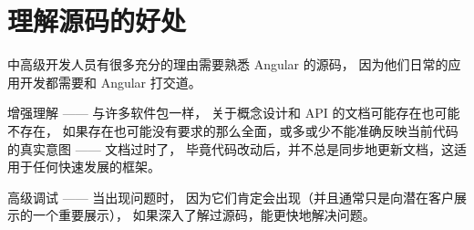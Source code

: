 \section{理解源码的好处}


中高级开发人员有很多充分的理由需要熟悉 Angular 的源码，
因为他们日常的应用开发都需要和 Angular 打交道。


增强理解 —— 与许多软件包一样，
关于概念设计和 API 的文档可能存在也可能不存在，
如果存在也可能没有要求的那么全面，或多或少不能准确反映当前代码的真实意图 —— 文档过时了，
毕竟代码改动后，并不总是同步地更新文档，这适用于任何快速发展的框架。


高级调试 —— 当出现问题时，
因为它们肯定会出现（并且通常只是向潜在客户展示的一个重要展示），
如果深入了解过源码，能更快地解决问题。


